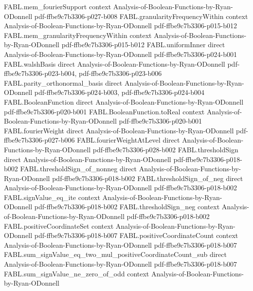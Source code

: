 \begin{theorem}
\proofstep
  {FABL.mem_fourierSupport}
  {context}
  {Analysis-of-Boolean-Functions-by-Ryan-ODonnell}
  {pdf-ffbe9c7b3306-p027-b008}
\proofstep
  {FABL.granularityFrequencyWithin}
  {context}
  {Analysis-of-Boolean-Functions-by-Ryan-ODonnell}
  {pdf-ffbe9c7b3306-p015-b012}
\proofstep
  {FABL.mem_granularityFrequencyWithin}
  {context}
  {Analysis-of-Boolean-Functions-by-Ryan-ODonnell}
  {pdf-ffbe9c7b3306-p015-b012}
\proofstep
  {FABL.uniformInner}
  {direct}
  {Analysis-of-Boolean-Functions-by-Ryan-ODonnell}
  {pdf-ffbe9c7b3306-p024-b001}
\proofstep
  {FABL.walshBasis}
  {direct}
  {Analysis-of-Boolean-Functions-by-Ryan-ODonnell}
  {pdf-ffbe9c7b3306-p023-b004,
    pdf-ffbe9c7b3306-p023-b006}
\proofstep
  {FABL.parity_orthonormal_basis}
  {direct}
  {Analysis-of-Boolean-Functions-by-Ryan-ODonnell}
  {pdf-ffbe9c7b3306-p024-b003,
    pdf-ffbe9c7b3306-p024-b004}
\proofstep
  {FABL.BooleanFunction}
  {direct}
  {Analysis-of-Boolean-Functions-by-Ryan-ODonnell}
  {pdf-ffbe9c7b3306-p020-b001}
\proofstep
  {FABL.BooleanFunction.toReal}
  {context}
  {Analysis-of-Boolean-Functions-by-Ryan-ODonnell}
  {pdf-ffbe9c7b3306-p020-b001}
\proofstep
  {FABL.fourierWeight}
  {direct}
  {Analysis-of-Boolean-Functions-by-Ryan-ODonnell}
  {pdf-ffbe9c7b3306-p027-b006}
\proofstep
  {FABL.fourierWeightAtLevel}
  {direct}
  {Analysis-of-Boolean-Functions-by-Ryan-ODonnell}
  {pdf-ffbe9c7b3306-p028-b002}
\proofstep
  {FABL.thresholdSign}
  {direct}
  {Analysis-of-Boolean-Functions-by-Ryan-ODonnell}
  {pdf-ffbe9c7b3306-p018-b002}
\proofstep
  {FABL.thresholdSign_of_nonneg}
  {direct}
  {Analysis-of-Boolean-Functions-by-Ryan-ODonnell}
  {pdf-ffbe9c7b3306-p018-b002}
\proofstep
  {FABL.thresholdSign_of_neg}
  {direct}
  {Analysis-of-Boolean-Functions-by-Ryan-ODonnell}
  {pdf-ffbe9c7b3306-p018-b002}
\proofstep
  {FABL.signValue_eq_ite}
  {context}
  {Analysis-of-Boolean-Functions-by-Ryan-ODonnell}
  {pdf-ffbe9c7b3306-p018-b002}
\proofstep
  {FABL.thresholdSign_neg}
  {context}
  {Analysis-of-Boolean-Functions-by-Ryan-ODonnell}
  {pdf-ffbe9c7b3306-p018-b002}
\proofstep
  {FABL.positiveCoordinateSet}
  {context}
  {Analysis-of-Boolean-Functions-by-Ryan-ODonnell}
  {pdf-ffbe9c7b3306-p018-b007}
\proofstep
  {FABL.positiveCoordinateCount}
  {context}
  {Analysis-of-Boolean-Functions-by-Ryan-ODonnell}
  {pdf-ffbe9c7b3306-p018-b007}
\proofstep
  {FABL.sum_signValue_eq_two_mul_positiveCoordinateCount_sub}
  {direct}
  {Analysis-of-Boolean-Functions-by-Ryan-ODonnell}
  {pdf-ffbe9c7b3306-p018-b007}
\proofstep
  {FABL.sum_signValue_ne_zero_of_odd}
  {context}
  {Analysis-of-Boolean-Functions-by-Ryan-ODonnell}

\end{theorem}
